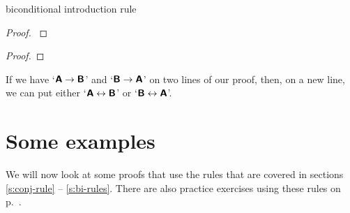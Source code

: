 \begin{factboxy}{biconditional introduction rule}
\begin{proof}\label{eiff-I}
	 
\end{proof}
\begin{proof}
	 
\end{proof}

\small{If we have `$\bm{\mathsf{A}}\rightarrow\bm{\mathsf{B}}$' and `$\bm{\mathsf{B}}\rightarrow\bm{\mathsf{A}}$' on two lines of our proof, then, on a new line, we can put either `$\bm{\mathsf{A}}\leftrightarrow\bm{\mathsf{B}}$' or `$\bm{\mathsf{B}}\leftrightarrow\bm{\mathsf{A}}$'.}

\end{factboxy}





\section{Some examples}

We will now look at some proofs that use the rules that are covered in sections \ref{s:conj-rule} -- \ref{s:bi-rules}. There are also practice exercises using these rules on p.~\pageref{practice-proofs-1}. 

